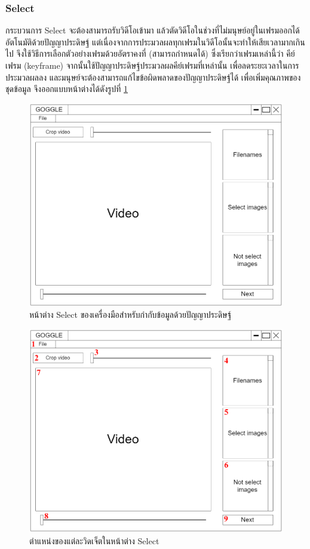 \subsubsection{Select}
กระบวนการ Select จะต้องสามารถรับวิดีโอเข้ามา แล้วตัดวิดีโอในช่วงที่ไม่มนุษย์อยู่ในเฟรมออกได้อัตโนมัติด้วยปัญญาประดิษฐ์
แต่เนื่องจากการประมวลผลทุกเฟรมในวิดีโอนั้นจะทำให้เสียเวลามากเกินไป จึงใช้วิธีการเลือกตัวอย่างเฟรมด้วยอัตราคงที่ (สามารถกำหนดได้)
ซึ่งเรียกว่าเฟรมเหล่านี้ว่า คีย์เฟรม (keyframe) จากนั้นใช้ปัญญาประดิษฐ์ประมวลผลคีย์เฟรมที่เหล่านั้น 
เพื่อลดระยะเวลาในการประมวลผลลง และมนุษย์จะต้องสามารถแก้ไขข้อผิดพลาดของปัญญาประดิษฐ์ได้ 
เพื่อเพิ่มคุณภาพของชุดข้อมูล จึงออกแบบหน้าต่างได้ดังรูปที่ \ref{fig:SelectDraft}

\begin{figure}[!ht]
    \centering
    \includegraphics[width=1\textwidth]{chapter3/images/3_6/SelectDraft.png}
    \caption{หน้าต่าง Select ของเครื่องมือสำหรับกำกับข้อมูลด้วยปัญญาประดิษฐ์}
    \label{fig:SelectDraft}
\end{figure}
\clearpage
\begin{figure}[!ht]
    \centering
    \includegraphics[width=1\textwidth]{chapter3/images/3_6/SelectDraft_point.png}
    \caption{ตำแหน่งของแต่ละวิดเจ็ตในหน้าต่าง Select}
    \label{fig:SelectDraft_point}
\end{figure}
